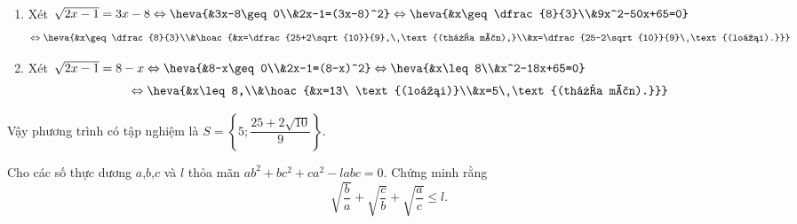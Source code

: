 \begin{ex}
{\begin{enumerate}
\begin{align*}
		\end{align*}
		\begin{enumerate}[TH 1.]
			\item Xét $\sqrt{2x-1}=3x-8\\ \Leftrightarrow \heva{&3x-8\geq0\\&2x-1=(3x-8)^2} \Leftrightarrow \heva{&x\geq\dfrac{8}{3}\\&9x^2-50x+65=0}$\\
$$	\Leftrightarrow \heva{&x\geq\dfrac{8}{3}\\&\hoac{&x=\dfrac{25+2\sqrt{10}}{9},\ \text{(thỏa mãn),}\\&x=\dfrac{25-2\sqrt{10}}{9}\ \text{(loại).}}}$$
			\item Xét $\sqrt{2x-1}=8-x \Leftrightarrow \heva{&8-x\geq0\\&2x-1=(8-x)^2} \Leftrightarrow \heva{&x\leq8\\&x^2-18x+65=0}$\\
			$$\Leftrightarrow \heva{&x\leq8,\\&\hoac{&x=13\ \text{(loại)}\\&x=5\ \text{(thỏa mãn).}}}$$
		\end{enumerate}
		Vậy phương trình có tập nghiệm là $S=\left\{5;\dfrac{25+2\sqrt{10}}{9}\right\}.$
		\end{enumerate}
			}
		\end{ex}
		\begin{ex}%
			Cho các số thực dương $a$,$b$,$c$ và $l$ thỏa mãn $ab^2+bc^2+ca^2-labc=0.$ Chứng minh rằng
			$$\sqrt{\dfrac{b}{a}}+\sqrt{\dfrac{c}{b}}+\sqrt{\dfrac{a}{c}}\leq l.$$
		\end{ex}

